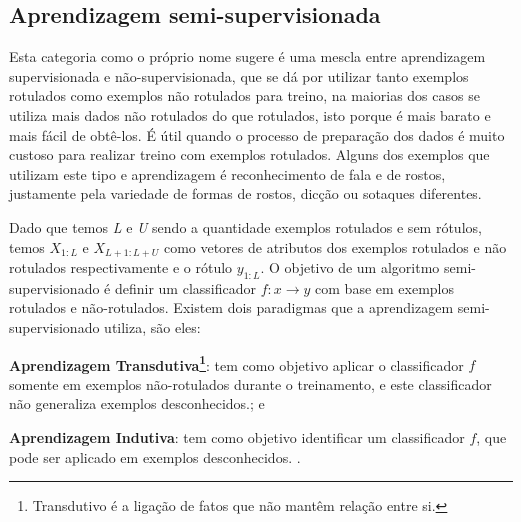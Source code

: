 \subsection{Aprendizagem semi-supervisionada}
\label{subsec:semi-supervised-learning}
Esta categoria como o próprio nome sugere é uma mescla entre aprendizagem supervisionada e não-supervisionada, 
que se dá por utilizar tanto exemplos rotulados como exemplos não rotulados para treino, na maiorias dos casos se utiliza 
mais dados não rotulados do que rotulados, isto porque é mais barato e mais fácil de obtê-los. É útil quando o processo de preparação
dos dados é muito custoso para realizar treino com exemplos  rotulados.
Alguns dos exemplos que utilizam este tipo e aprendizagem é reconhecimento de fala e de rostos, justamente pela variedade
de formas de rostos, dicção ou sotaques diferentes.

Dado que temos \textit{L} e \textit{U} sendo a quantidade exemplos rotulados e sem rótulos, temos $X_{1:L}$ e $X_{L+1: L+U}$ como vetores de atributos dos exemplos
rotulados e não rotulados respectivamente e o rótulo $y_{1:L}$.  O objetivo de um algoritmo semi-supervisionado é definir 
um classificador $f : x \rightarrow y$ com base em exemplos rotulados e não-rotulados. Existem dois paradigmas que a aprendizagem
semi-supervisionado utiliza, são eles:

\begin{alineas}
	\item \textbf{Aprendizagem Transdutiva\footnote{Transdutivo é a ligação de fatos que não mantêm relação entre si.}}: tem como objetivo aplicar o classificador $f$ somente em exemplos 
	não-rotulados durante o treinamento, e este classificador não generaliza exemplos desconhecidos.\cite{Zhu03semi-supervisedlearning,Zhou04learningwith}; e
	\item \textbf{Aprendizagem Indutiva}: tem como objetivo identificar um classificador $f$, que pode ser aplicado em exemplos desconhecidos.
	\cite{indutive-learning}. 
\end{alineas} 